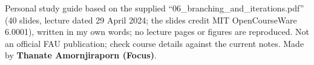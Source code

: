 \documentclass[11pt]{article}
\begin{document}
\vfill{\small Personal study guide based on the supplied “06\_branching\_and\_iterations.pdf” (40 slides, lecture dated 29 April 2024; the slides credit MIT OpenCourseWare 6.0001), written in my own words; no lecture pages or figures are reproduced. Not an official FAU publication; check course details against the current notes. Made by \textbf{Thanate Amornjiraporn (Focus)}.}
\end{document}
